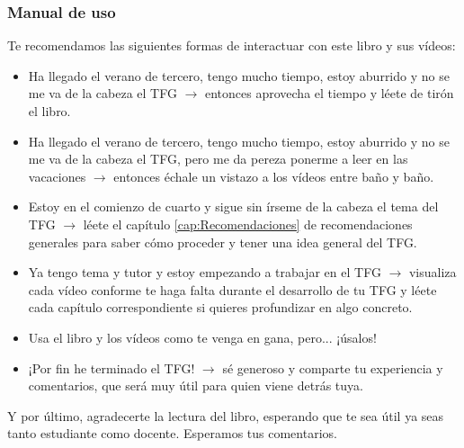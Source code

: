 \subsubsection*{Manual de uso}

Te recomendamos las siguientes formas de interactuar con este libro y sus vídeos:

\begin{itemize} \item Ha llegado el verano de tercero, tengo mucho tiempo, estoy aburrido y no se me va de la cabeza el TFG $\rightarrow$ entonces aprovecha el tiempo y léete de tirón el libro.

\item Ha llegado el verano de tercero, tengo mucho tiempo, estoy aburrido y no se me va de la cabeza el TFG, pero me da pereza ponerme a leer en las vacaciones $\rightarrow$ entonces échale un vistazo a los vídeos entre baño y baño.

\item Estoy en el comienzo de cuarto y sigue sin írseme de la cabeza el tema del TFG $\rightarrow$ léete el capítulo \ref{cap:Recomendaciones} de recomendaciones generales para saber cómo proceder y tener una idea general del TFG.

\item Ya tengo tema y tutor y estoy empezando a trabajar en el TFG $\rightarrow$ visualiza cada vídeo conforme te haga falta durante el desarrollo de tu TFG y léete cada capítulo correspondiente si quieres profundizar en algo concreto.

\item Usa el libro y los vídeos como te venga en gana, pero... ¡úsalos! 

\item ¡Por fin he terminado el TFG! $\rightarrow$ sé generoso y comparte tu experiencia y comentarios, que será muy útil para quien viene detrás tuya.

\end{itemize}

Y por último, agradecerte la lectura del libro, esperando que te sea útil ya seas tanto estudiante como docente. Esperamos tus comentarios.

